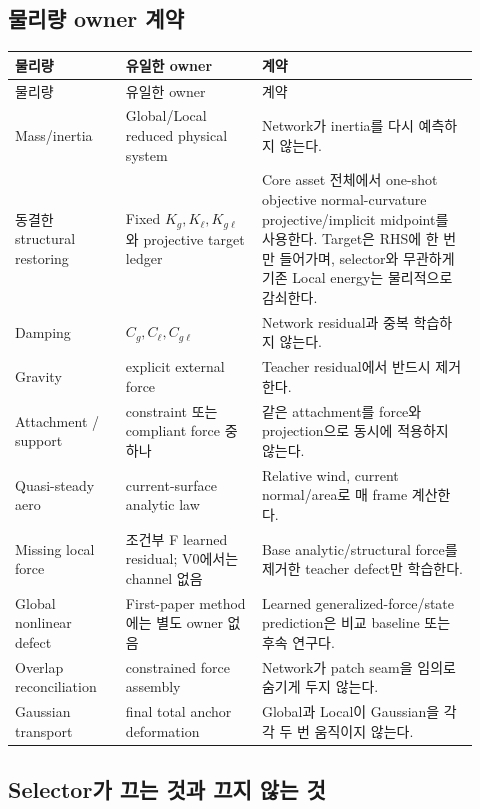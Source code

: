 \documentclass[11pt,a4paper]{article}
\begin{document}
\subsection{물리량 owner 계약}

\begin{longtable}{L{0.22\linewidth}L{0.27\linewidth}L{0.43\linewidth}}
\toprule
물리량 & 유일한 owner & 계약 \\
\midrule
\endfirsthead
\toprule
물리량 & 유일한 owner & 계약 \\
\midrule
\endhead
Mass/inertia & Global/Local reduced physical system & Network가 inertia를 다시 예측하지 않는다. \\
\addlinespace
동결한 structural restoring & Fixed \(K_g,K_\ell,K_{g\ell}\)와 projective target ledger & Core asset 전체에서 one-shot objective normal-curvature projective/implicit midpoint를 사용한다. Target은 RHS에 한 번만 들어가며, selector와 무관하게 기존 Local energy는 물리적으로 감쇠한다. \\
\addlinespace
Damping & \(C_g,C_\ell,C_{g\ell}\) & Network residual과 중복 학습하지 않는다. \\
\addlinespace
Gravity & explicit external force & Teacher residual에서 반드시 제거한다. \\
\addlinespace
Attachment / support & constraint 또는 compliant force 중 하나 & 같은 attachment를 force와 projection으로 동시에 적용하지 않는다. \\
\addlinespace
Quasi-steady aero & current-surface analytic law & Relative wind, current normal/area로 매 frame 계산한다. \\
\addlinespace
Missing local force & 조건부 F learned residual; V0에서는 channel 없음 & Base analytic/structural force를 제거한 teacher defect만 학습한다. \\
\addlinespace
Global nonlinear defect & First-paper method에는 별도 owner 없음 & Learned generalized-force/state prediction은 비교 baseline 또는 후속 연구다. \\
\addlinespace
Overlap reconciliation & constrained force assembly & Network가 patch seam을 임의로 숨기게 두지 않는다. \\
\addlinespace
Gaussian transport & final total anchor deformation & Global과 Local이 Gaussian을 각각 두 번 움직이지 않는다. \\
\bottomrule
\end{longtable}

\subsection{Selector가 끄는 것과 끄지 않는 것}
\end{document}
